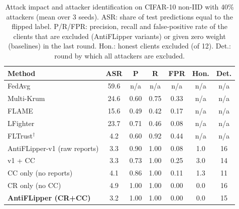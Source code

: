 \begin{table}[t]
\centering
\caption{Attack impact and attacker identification on CIFAR-10 non-IID with 40\% attackers (mean over 3 seeds). ASR: share of test predictions equal to the flipped label. P/R/FPR: precision, recall and false-positive rate of the clients that are excluded (AntiFLipper variants) or given zero weight (baselines) in the last round. Hon.: honest clients excluded (of 12). Det.: round by which all attackers are excluded.}
\label{tab:detection}
\renewcommand{\arraystretch}{1.1}
\footnotesize
\setlength{\tabcolsep}{3pt}
\begin{tabular}{l|c|ccc|cc}
\hline
\textbf{Method} & \textbf{ASR} & \textbf{P} & \textbf{R} & \textbf{FPR} & \textbf{Hon.} & \textbf{Det.} \\
\hline
FedAvg & 59.6 & n/a & n/a & n/a & n/a & n/a \\
Multi-Krum & 24.6 & 0.60 & 0.75 & 0.33 & n/a & n/a \\
FLAME & 15.6 & 0.49 & 0.42 & 0.17 & n/a & n/a \\
LFighter & 23.7 & 0.71 & 0.46 & 0.08 & n/a & n/a \\
FLTrust$^\dagger$ & 4.2 & 0.60 & 0.92 & 0.44 & n/a & n/a \\
\hline
AntiFLipper-v1 (raw reports) & 3.3 & 0.90 & 1.00 & 0.08 & 1.0 & 16 \\
\quad v1 + CC & 3.3 & 0.73 & 1.00 & 0.25 & 3.0 & 14 \\
\quad CC only (no reports) & 4.1 & 0.86 & 1.00 & 0.11 & 1.3 & 11 \\
\quad CR only (no CC) & 4.9 & 1.00 & 1.00 & 0.00 & 0.0 & 16 \\
\textbf{AntiFLipper (CR+CC)} & 3.2 & 1.00 & 1.00 & 0.00 & 0.0 & 15 \\
\hline
\end{tabular}
\end{table}
